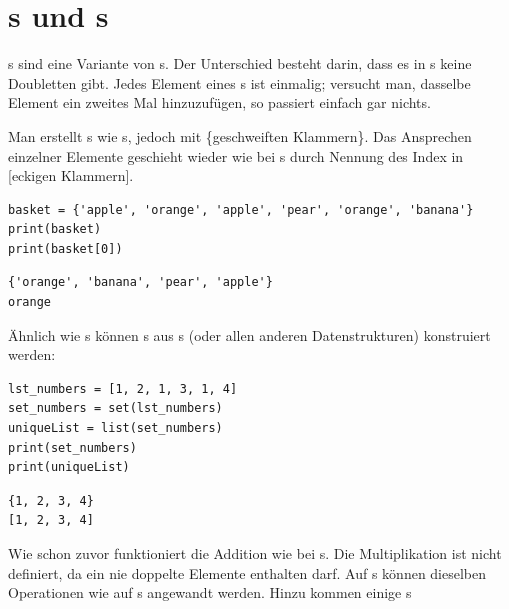 \section{s und s}
s sind eine Variante von s. Der Unterschied besteht darin, dass es in s keine Doubletten gibt. Jedes Element eines s ist einmalig; versucht man, dasselbe Element ein zweites Mal hinzuzufügen, so passiert einfach gar nichts.

Man erstellt s wie s, jedoch mit \{geschweiften Klammern\}. Das Ansprechen einzelner Elemente geschieht wieder wie bei s durch Nennung des Index in [eckigen Klammern]. 

\begin{codebox}
\begin{verbatim}
basket = {'apple', 'orange', 'apple', 'pear', 'orange', 'banana'}
print(basket)
print(basket[0])
\end{verbatim}
\end{codebox}

\begin{cmdbox}[Ausgabe]
\begin{verbatim}
{'orange', 'banana', 'pear', 'apple'}
orange
\end{verbatim}
\end{cmdbox}

Ähnlich wie s können s aus s (oder allen anderen Datenstrukturen) konstruiert werden:

\begin{codebox}
\begin{verbatim}
lst_numbers = [1, 2, 1, 3, 1, 4]
set_numbers = set(lst_numbers)
uniqueList = list(set_numbers)
print(set_numbers)
print(uniqueList)
\end{verbatim}
\end{codebox}

\begin{cmdbox}[Ausgabe]
\begin{verbatim}
{1, 2, 3, 4}
[1, 2, 3, 4]
\end{verbatim}
\end{cmdbox}

Wie schon zuvor funktioniert die Addition wie bei s. Die Multiplikation ist nicht definiert, da ein  nie doppelte Elemente enthalten darf. Auf s können dieselben Operationen wie auf s angewandt werden. Hinzu kommen einige s

